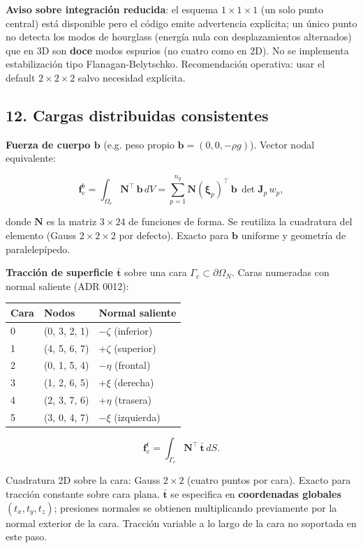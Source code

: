 \documentclass[11pt,letterpaper,oneside]{report}
\begin{document}
\textbf{Aviso sobre integración reducida}: el esquema $1 \times 1 \times 1$ (un solo punto central) está disponible pero el código emite advertencia explícita; un único punto no detecta los modos de hourglass (energía nula con desplazamientos alternados) que en 3D son \textbf{doce} modos espurios (no cuatro como en 2D). No se implementa estabilización tipo Flanagan-Belytschko. Recomendación operativa: usar el default $2 \times 2 \times 2$ salvo necesidad explícita.

\subsection{12. Cargas distribuidas consistentes}

\textbf{Fuerza de cuerpo $\mathbf b$} (e.g. peso propio $\mathbf b = (0, 0, -\rho g)$). Vector nodal equivalente:

\[
\mathbf f_e^{b} = \int_{\Omega_e} \mathbf N^\top\,\mathbf b\, dV = \sum_{p=1}^{n_g} \mathbf N(\boldsymbol\xi_p)^\top\,\mathbf b\,\det\mathbf J_p\, w_p,
\]

donde $\mathbf N$ es la matriz $3 \times 24$ de funciones de forma. Se reutiliza la cuadratura del elemento (Gauss $2 \times 2 \times 2$ por defecto). Exacto para $\mathbf b$ uniforme y geometría de paralelepípedo.

\textbf{Tracción de superficie $\bar{\mathbf t}$} sobre una cara $\Gamma_e \subset \partial\Omega_N$. Caras numeradas con normal saliente (ADR 0012):

\begin{center}
\begin{tabularx}{\textwidth}{YYY}
\hline
\textbf{Cara} & \textbf{Nodos} & \textbf{Normal saliente} \\
 & (0, 3, 2, 1) & −\ensuremath{\zeta} (inferior) \\
1 & (4, 5, 6, 7) & +\ensuremath{\zeta} (superior) \\
2 & (0, 1, 5, 4) & −\ensuremath{\eta} (frontal) \\
3 & (1, 2, 6, 5) & +\ensuremath{\xi} (derecha) \\
4 & (2, 3, 7, 6) & +\ensuremath{\eta} (trasera) \\
5 & (3, 0, 4, 7) & −\ensuremath{\xi} (izquierda) \\
\hline
\end{tabularx}
\end{center}
\[
\mathbf f_e^{t} = \int_{\Gamma_e} \mathbf N^\top\,\bar{\mathbf t}\, dS.
\]

Cuadratura 2D sobre la cara: Gauss $2 \times 2$ (cuatro puntos por cara). Exacto para tracción constante sobre cara plana. $\bar{\mathbf t}$ se especifica en \textbf{coordenadas globales} $(t_x, t_y, t_z)$; presiones normales se obtienen multiplicando previamente por la normal exterior de la cara. Tracción variable a lo largo de la cara no soportada en este paso.
\end{document}
